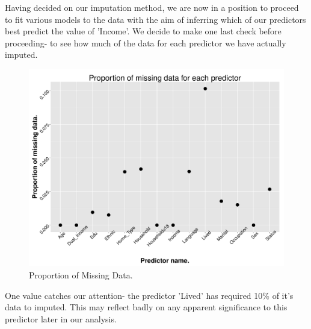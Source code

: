 \documentclass[11pt]{article}
\begin{document}
Having decided on our imputation method, we are now in a position to proceed to fit various models to the data with the aim of inferring which of our predictors best predict the value of 'Income'. We decide to make one last check before proceeding- to see how much of the data for each predictor we have actually imputed.



\begin{figure}[h!]
  \caption{Proportion of Missing Data.}
  \centering
    \includegraphics[width=1.0\textwidth]{HandlingMissingData/PropMissingData.pdf}
\end{figure}


One value catches our attention- the predictor 'Lived' has required 10\% of it's data to imputed. This may reflect badly on any apparent significance to this predictor later in our analysis.
\end{document}
